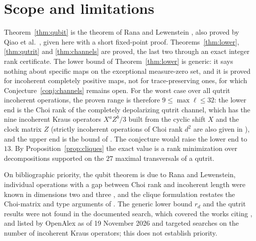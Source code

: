 \documentclass[11pt,a4paper]{article}
\theoremstyle{definition}
\theoremstyle{plain}
\begin{document}
\section{Scope and limitations}\label{sec:scope}
Theorem~\ref{thm:qubit} is the theorem of Rana and Lewenstein
\cite{RanaLewenstein2018}, also proved by Qiao et al.\ \cite{Qiao2020}, given
here with a short fixed-point proof. Theorems~\ref{thm:lower}, \ref{thm:qutrit} and
\ref{thm:channels} are proved, the last two through an exact integer rank
certificate. The lower bound of Theorem~\ref{thm:lower} is generic: it says
nothing about specific maps on the exceptional measure-zero set, and it is
proved for incoherent completely positive maps, not for trace-preserving
ones, for which Conjecture~\ref{conj:channels} remains open. For the worst
case over all qutrit incoherent operations, the proven range is therefore
$9\le\max\ell\le32$: the lower end is the Choi rank of the completely
depolarizing qutrit channel, which has the nine incoherent Kraus operators
$X^aZ^b/3$ built from the cyclic shift $X$ and the clock matrix $Z$ (strictly
incoherent operations of Choi rank $d^2$ are also given in
\cite[Prop.~7]{Streltsov2017PRL}), and the upper end is the bound of
\cite{Qiao2020}. The conjecture would raise the lower end to $13$. By
Proposition~\ref{prop:cliques} the exact value is a rank minimization over
decompositions supported on the $27$ maximal transversals of a qutrit.

On bibliographic priority, the qubit theorem is due to Rana and Lewenstein,
individual operations with a gap between Choi rank and incoherent length were
known in dimensions two and three \cite{RanaLewenstein2018}, and the clique
formulation restates the Choi-matrix and type arguments of
\cite{Streltsov2017PRL}. The generic lower bound $r_d$ and the qutrit results
were not found in the documented search, which covered the works citing
\cite{Streltsov2017PRL}, \cite{RanaLewenstein2018} and \cite{Qiao2020} listed
by OpenAlex as of 19 November 2026 and targeted searches on the number of
incoherent Kraus operators; this does not establish priority.
\end{document}
